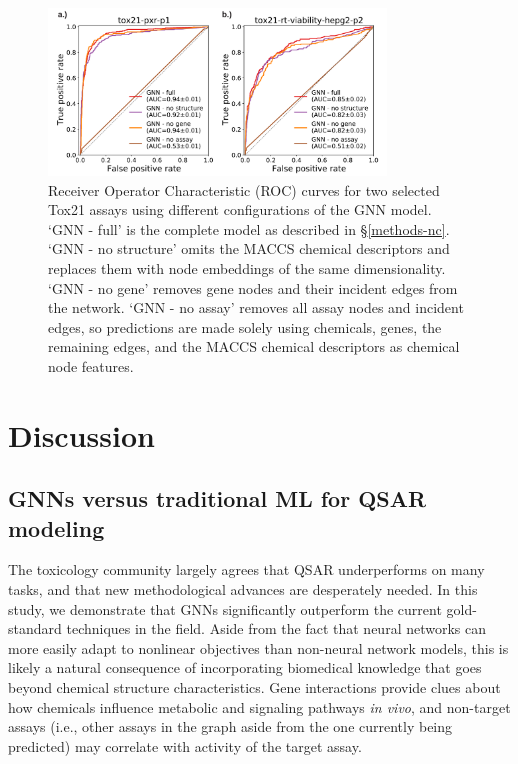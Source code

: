 \documentclass{ws-procs11x85}
\begin{document}
\begin{figure}
   \centering
   \includegraphics[width=0.8\textwidth]{figures/figure5.pdf}
   \caption{Receiver Operator Characteristic (ROC) curves for two selected Tox21 assays using different configurations of the GNN model. `GNN - full' is the complete model as described in \S\ref{methods-nc}. `GNN - no structure' omits the MACCS chemical descriptors and replaces them with node embeddings of the same dimensionality. `GNN - no gene' removes gene nodes and their incident edges from the network. `GNN - no assay' removes all assay nodes and incident edges, so predictions are made solely using chemicals, genes, the remaining edges, and the MACCS chemical descriptors as chemical node features.}\label{fig:5}
\end{figure}

\section{Discussion}

\subsection{GNNs versus traditional ML for QSAR modeling}
The toxicology community largely agrees that QSAR underperforms on many tasks, and that new methodological advances are desperately needed.
In this study, we demonstrate that GNNs significantly outperform the current gold-standard techniques in the field.
Aside from the fact that neural networks can more easily adapt to nonlinear objectives than non-neural network models, this is likely a natural consequence of incorporating biomedical knowledge that goes beyond chemical structure characteristics.
Gene interactions provide clues about how chemicals influence metabolic and signaling pathways \textit{in vivo}, and non-target assays (i.e., other assays in the graph aside from the one currently being predicted) may correlate with activity of the target assay.
\end{document}
